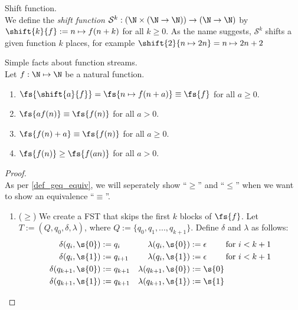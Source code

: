 \begin{definition}{Shift function.}\label{shift_function_def}\\
	We define the \textit{shift function} $\mathcal{S}^{k}: (\N \times (\N \to \N)) \to (\N \to \N)$ by $\shift{k}{f} := n \mapsto f(n + k)$ for all $k\geq 0$. As the name suggests, $\mathcal{S}^k$ shifts a given function $k$ places, for example $\shift{2}{n \mapsto 2n} = n \mapsto 2n+2$
\end{definition}

\begin{lemma}{Simple facts about function streams.}\label{simple_fs_facts}\\
	Let $f: \N \mapsto \N$ be a natural function.
	\begin{enumerate}
		\item $\fs{\shift{a}{f}} = \fs{n \mapsto f(n+a)} \equiv \fs{f}$ for all $a\geq0$. \label{simple_fs_facts.shift}
		\item $\fs{af(n)} \equiv \fs{f(n)}$ for all $a>0$. \label{simple_fs_facts.divide}
		\item $\fs{f(n) + a} \equiv \fs{f(n)}$ for all $a\geq0$. \label{simple_fs_facts.plus_a}
		\item $\fs{f(n)} \geq \fs{f(an)}$ for all $a>0$. \label{simple_fs_facts.an}
	\end{enumerate}
	\begin{proof}\hfill\nopagebreak\\
		\nopagebreak
		As per \cref{def_geq_equiv}, we will seperately show ``$\geq$'' and ``$\leq$'' when we want to show an equivalence ``$\equiv$''.
		\begin{enumerate}
			\item ($\geq$) We create a FST that skips the first $k$ blocks of $\fs{f}$. Let $T := (Q,q_0,\delta,\lambda)$, where $Q := \{q_0,q_1,...,q_{k+1}\}$. Define $\delta$ and $\lambda$ as follows: 
			\begin{align*}
				\delta(q_i, \s{0}) &:= q_i & \lambda(q_i,\s{0}) &:= \epsilon \qquad\text{ for } i < k + 1\\
				\delta(q_i, \s{1}) &:= q_{i + 1} & \lambda(q_i,\s{1}) &:= \epsilon \qquad\text{ for } i < k + 1\\
				\delta(q_{k+1}, \s{0}) &:= q_{k+1} & \lambda(q_{k+1},\s{0}) &:= \s{0} \\
				\delta(q_{k+1}, \s{1}) &:= q_{k+1} & \lambda(q_{k+1},\s{1}) &:= \s{1}
			\end{align*}

\end{enumerate}
\end{proof}
\end{lemma}
